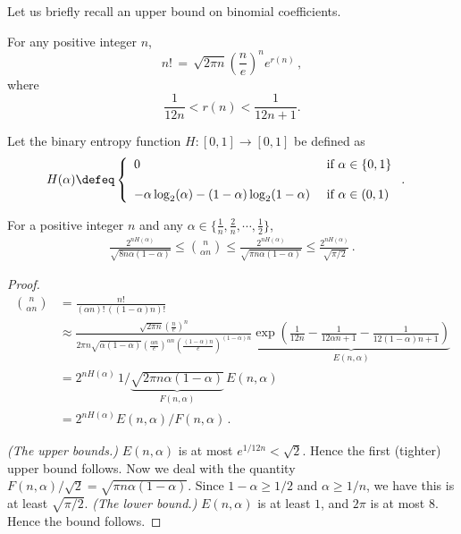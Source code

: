 Let us briefly recall an upper bound on binomial coefficients.

\begin{theorem}
For any positive integer $n$,
\[
n! \, = \, \sqrt{2\pi n}(\frac{n}{e})^n e^{r(n)}\, ,
\]where
\[
\frac{1}{12n} < r(n) < \frac{1}{12n + 1}.
\]
\end{theorem}

Let the binary entropy function $H : [0, 1] \rightarrow [0, 1]$ be defined as
\begin{align*}
H(\alpha) & \defeq \left\{ \begin{array}{ll}0 & \text{ if } \alpha \in \{0, 1\}\\
\\
-\alpha \log_2(\alpha) - (1-\alpha) \log_2(1-\alpha) & \text{ if } \alpha \in (0, 1)\end{array} \right. .
\end{align*}

\begin{corollary}\label{coro:nchoosek_1}
For a positive integer $n$ and any $\alpha \in \{\frac{1}{n}, \frac{2}{n}, \cdots, \frac{1}{2} \}$, 
\begin{align}\label{eq:nck}
  \frac{2^{n H(\alpha)}}{\sqrt{8 n\alpha (1-\alpha)}} 
  \leq {n \choose \alpha n} 
  \leq \frac{2^{n H(\alpha)}}{\sqrt{\pi n\alpha (1-\alpha)}} 
  \leq \frac{2^{n H(\alpha)}}{\sqrt{\pi/2}} \, .
\end{align}
\end{corollary}

\begin{proof}
\begin{align*}
{n \choose \alpha n}
&= \frac{n!}{(\alpha n)!\, \left( (1-\alpha)n \right)! }\\
&\approx \frac{\sqrt{2\pi n}(\frac{n}{e})^n}{2\pi n\sqrt{\alpha (1-\alpha)}(\frac{\alpha n}{e})^{\alpha n}(\frac{(1-\alpha)n}{e})^{(1-\alpha)n} } \underbrace{ \exp\left( \frac{1}{12n} - \frac{1}{12\alpha n + 1} - \frac{1}{12(1-\alpha)n+1}\right) }_{ E(n,\alpha) } \\
&= 2^{n H(\alpha)} \, 1/\underbrace{ \sqrt{2 \pi n\alpha (1-\alpha)} }_{F(n, \alpha)} \, E(n, \alpha) \\
&=2^{n H(\alpha)} E(n, \alpha)/F(n, \alpha) \, .
\end{align*}

\emph{(The upper bounds.)} $E(n,\alpha)$ is at most $e^{1/12 n} < \sqrt{2}$. Hence the first (tighter) upper bound follows. Now we deal with the quantity $F(n, \alpha)/\sqrt{2} = \sqrt{\pi n \alpha (1-\alpha)}$. Since $1-\alpha \geq 1/2$ and $\alpha \geq 1/n$, we have this is at least $ \sqrt{\pi/2}$. \emph{(The lower bound.)} $E(n, \alpha)$ is at least $1$, and $2\pi$ is at most $8$. Hence the bound follows.

\end{proof}

